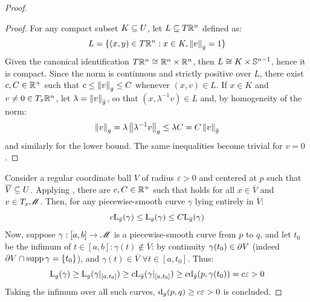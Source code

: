 \begin{proofbox}
\begin{proof}
    \begin{proofbox}
      \begin{proof}
        For any compact subset $ K \subseteq U $, let $ L \subseteq T\mathbb{R}^n $ defined as:
        \begin{equation*}
          L = \{(x,y) \in T\mathbb{R}^n : x \in K , \left\lVert v\right\rVert_g = 1\}
        \end{equation*}
        Given the canonical identification $ T\mathbb{R}^n \cong \mathbb{R}^n \times \mathbb{R}^n $, then $ L \cong K \times \mathbb{S}^{n-1} $, hence it is compact. Since the norm is continuous and strictly positive over $ L $, there exist $ c,C \in \mathbb{R}^+ $ such that $ c \leq \left\lVert v\right\rVert_g \leq C $ whenever $ (x,v) \in L $. If $ x \in K $ and $ v \neq 0 \in T_x\mathbb{R}^n $, let $ \lambda = \left\lVert v\right\rVert_{\bar{g}} $, so that $ (x,\lambda^{-1}v) \in L $ and, by homogeneity of the norm:
        \begin{equation*}
          \left\lVert v\right\rVert_g = \lambda \left\lVert\lambda^{-1} v\right\rVert_g \leq \lambda C = C \left\lVert v\right\rVert_{\bar{g}}
        \end{equation*}
        and similarly for the lower bound. The same inequalities become trivial for $ v = 0 $.
      \end{proof}
    \end{proofbox}

    Consider a regular coordinate ball $ V $ of radius $ \varepsilon > 0 $ and centered at $ p $ such that $ \overline{V} \subseteq U $. Applying , there are $ c,C \in \mathbb{R}^+ $ such that  holds for all $ x \in \overline{V} $ and $ v \in T_x \mathscr{M} $. Then, for any piecewise-smooth curve $ \gamma $ lying entirely in $ \overline{V} $:
    \begin{equation*}
      c \mathrm{L}_{\bar{g}}(\gamma) \leq \mathrm{L}_g(\gamma) \leq C \mathrm{L}_{\bar{g}}(\gamma)
    \end{equation*}
    Now, suppose $ \gamma : [a,b] \rightarrow \mathscr{M} $ is a piecewise-smooth curve from $ p $ to $ q $, and let $ t_0 $ be the infimum of $ t \in [a,b] : \gamma(t) \notin \overline{V} $: by continuity $ \gamma(t_0) \in \partial V $ (indeed $ \partial V \cap \operatorname{supp} \gamma = \{t_0\} $), and $ \gamma(t) \in \overline{V} \,\,\forall t \in [a,t_0] $. Thus:
    \begin{equation*}
      \mathrm{L}_g(\gamma) \geq \mathrm{L}_g(\gamma \vert_{[a,t_0]}) \geq c \mathrm{L}_{\bar{g}}(\gamma \vert_{[a,t_0]}) \geq c \mathrm{d}_{\bar{g}}(p , \gamma(t_0)) = c \varepsilon > 0
    \end{equation*}
    Taking the infimum over all such curves, $ \mathrm{d}_g(p,q) \geq c \varepsilon > 0 $ is concluded.


\end{proof}
\end{proofbox}
